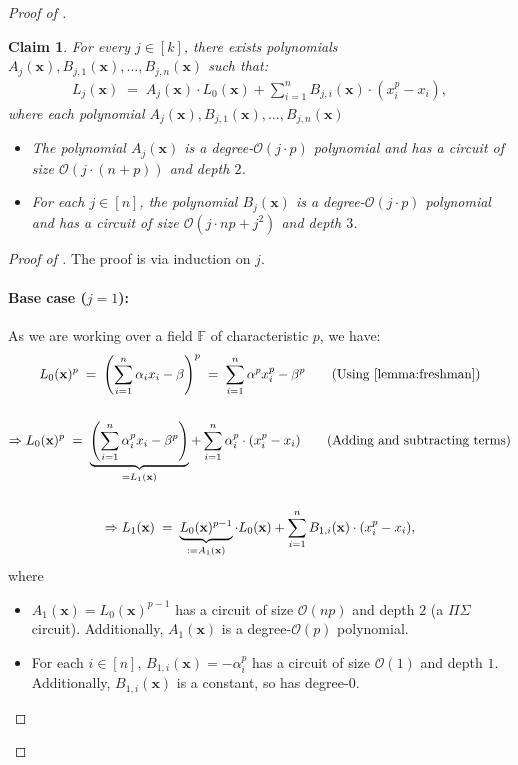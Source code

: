 \documentclass[11pt]{article}
\newtheorem{claim}[theorem]{Claim}
\newcommand{\bigO}{\mathcal{O}}
\newcommand{\paren}[1]{\left( #1 \right)}
\newcommand{\F}{\mathbb{F}}
\begin{document}
\begin{proof}[Proof of ]
\begin{claim}\label{claim:Lj-L0-mod-const-depth}
For every $j \in [k]$, there exists polynomials $A_{j}(\mathbf{x}), B_{j,1}(\mathbf{x}), \ldots, B_{j,n}(\mathbf{x})$ such that:
\begin{align*}
    L_{j}(\mathbf{x}) \; = \; A_{j}(\mathbf{x}) \cdot L_{0}(\mathbf{x}) + \sum_{i = 1}^{n} B_{j,i}(\mathbf{x}) \cdot (x_{i}^{p} - x_{i}),
\end{align*}
where each polynomial $A_{j}(\mathbf{x}), B_{j,1}(\mathbf{x}), \ldots, B_{j,n}(\mathbf{x})$
\begin{itemize}
    \item The polynomial $A_{j}(\mathbf{x})$ is a degree-$\bigO(j \cdot p)$ polynomial and has a circuit of size $\bigO(j \cdot (n+p))$ and depth $2$.
    \item For each $j \in [n]$, the polynomial $B_{j}(\mathbf{x})$ is a degree-$\bigO(j \cdot p)$ polynomial and has a circuit of size $\bigO(j \cdot np + j^{2})$ and depth $3$.
\end{itemize}
\end{claim}
\begin{proof}[Proof of ]
The proof is via induction on $j$.

\paragraph{Base case ($j = 1$):}As we are working over a field $\F$ of characteristic $p$, we have:
\begin{gather*}
    L_{0}(\mathbf{x})^{p} \; = \; \paren{\sum_{i=1}^{n} \alpha_{i} x_{i} - \beta}^{p} \; = \; \sum_{i=1}^{n} \alpha^{p} x_{i}^{p} - \beta^{p} \quad \quad (\text{Using \Cref{lemma:freshman}}) \\ \\
   \Rightarrow L_{0}(\mathbf{x})^{p} \; = \; \underbrace{\paren{\sum_{i=1}^{n} \alpha_{i}^{p} x_{i} - \beta^{p}}}_{= L_{1}(\mathbf{x})} + \sum_{i=1}^{n} \alpha_{i}^{p} \cdot (x_{i}^{p} - x_{i}) \quad \quad (\text{Adding and subtracting terms}) \\ \\
   \Rightarrow L_{1}(\mathbf{x}) \; = \; \underbrace{L_{0}(\mathbf{x})^{p-1}}_{:= A_{1}(\mathbf{x})} \cdot L_{0}(\mathbf{x}) + \sum_{i = 1}^{n} B_{1,i}(\mathbf{x}) \cdot (x_{i}^{p} - x_{i}),
\end{gather*}
where
\begin{itemize}
    \item $A_{1}(\mathbf{x}) = L_{0}(\mathbf{x})^{p-1}$ has a circuit of size $\bigO(np)$ and depth $2$ (a $\Pi \Sigma$ circuit). Additionally, $A_{1}(\mathbf{x})$ is a degree-$\bigO(p)$ polynomial.
    \item For each $i \in [n]$, $B_{1,i}(\mathbf{x}) = -\alpha_{i}^{p}$ has a circuit of size $\bigO(1)$ and depth $1$. Additionally, $B_{1,i}(\mathbf{x})$ is a constant, so has degree-$0$.
\end{itemize}




\end{proof}
\end{proof}
\end{document}
